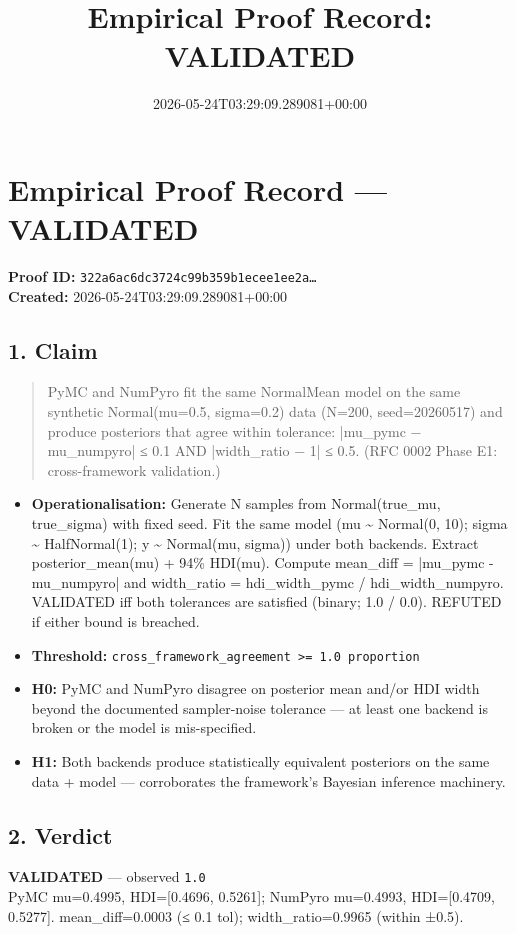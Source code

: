\documentclass{article}
\title{Empirical Proof Record: VALIDATED}
\date{2026-05-24T03:29:09.289081+00:00}
\begin{document}
\maketitle
\section*{Empirical Proof Record --- \textcolor{validated}{\textbf{VALIDATED}}}
\textbf{Proof ID:} \texttt{322a6ac6dc3724c99b359b1ecee1ee2a\dots}\\
\textbf{Created:} 2026-05-24T03:29:09.289081+00:00
\subsection*{1. Claim}
\begin{quote}PyMC and NumPyro fit the same NormalMean model on the same synthetic Normal(mu=0.5, sigma=0.2) data (N=200, seed=20260517) and produce posteriors that agree within tolerance: |mu\_pymc − mu\_numpyro| ≤ 0.1 AND |width\_ratio − 1| ≤ 0.5. (RFC 0002 Phase E1: cross-framework validation.)\end{quote}
\begin{itemize}
\item \textbf{Operationalisation:} Generate N samples from Normal(true\_mu, true\_sigma) with fixed seed. Fit the same model (mu \textasciitilde{} Normal(0, 10); sigma \textasciitilde{} HalfNormal(1); y \textasciitilde{} Normal(mu, sigma)) under both backends. Extract posterior\_mean(mu) + 94\% HDI(mu). Compute mean\_diff = |mu\_pymc - mu\_numpyro| and width\_ratio = hdi\_width\_pymc / hdi\_width\_numpyro. VALIDATED iff both tolerances are satisfied (binary; 1.0 / 0.0). REFUTED if either bound is breached.
\item \textbf{Threshold:} \texttt{cross\_framework\_agreement >= 1.0 proportion}
\item \textbf{H0:} PyMC and NumPyro disagree on posterior mean and/or HDI width beyond the documented sampler-noise tolerance — at least one backend is broken or the model is mis-specified.
\item \textbf{H1:} Both backends produce statistically equivalent posteriors on the same data + model — corroborates the framework's Bayesian inference machinery.
\end{itemize}
\subsection*{2. Verdict}
\textcolor{validated}{\textbf{VALIDATED}} --- observed \texttt{1.0}\\
PyMC mu=0.4995, HDI=[0.4696, 0.5261]; NumPyro mu=0.4993, HDI=[0.4709, 0.5277]. mean\_diff=0.0003 (≤ 0.1 tol); width\_ratio=0.9965 (within ±0.5).
\end{document}
